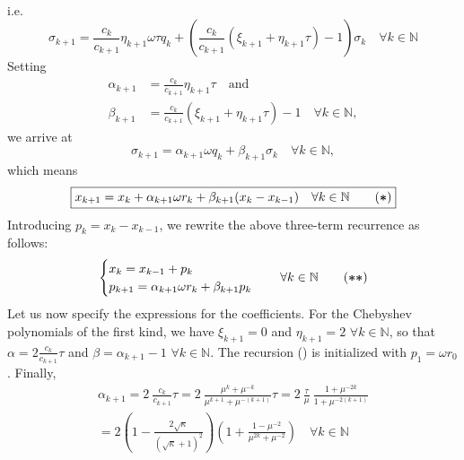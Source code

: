 \documentclass[12pt]{article}
\theoremstyle{definition}
\theoremstyle{remark}
\numberwithin{equation}{section}
\newcommand{\N}{\mathbb{N}}
\newcommand{\bigast}{\textbf{\textasteriskcentered}}
\begin{document}
\begin{enumerate}[label=(\roman*)]
\begin{align*}
      \end{align*}
      i.e.
      \begin{equation*}
        \sigma_{k+1} = \frac{c_k}{c_{k+1}} \eta_{k+1} \omega \tau q_k + \left(\frac{c_k}{c_{k+1}}(\xi_{k+1} + \eta_{k+1} \tau) - 1\right) \sigma_k \quad \forall k \in \N
      \end{equation*}
      Setting
      \begin{align*}
        \alpha_{k+1} &= \frac{c_k}{c_{k+1}} \eta_{k+1} \tau \quad \text{and}\\
        \beta_{k+1} &= \frac{c_k}{c_{k+1}}(\xi_{k+1} + \eta_{k+1} \tau) - 1 \quad \forall k \in \N,
      \end{align*}
      we arrive at
      \begin{equation*}
        \sigma_{k+1} = \alpha_{k+1} \omega q_k + \beta_{k+1} \sigma_k \quad \forall k \in \N,
      \end{equation*}
      which means
      \begin{equation*}
        \boxed{
          x_{k+1} = x_k + \alpha_{k+1} \omega r_k + \beta_{k+1} (x_k - x_{k-1}) \quad \forall k \in \N \tag{\bigast}
        }
      \end{equation*}
      Introducing $p_k = x_k - x_{k-1}$, we rewrite the above three-term recurrence as follows:
      \begin{equation*}
        \begin{cases}
          x_k = x_{k-1} + p_k\\
          p_{k+1} = \alpha_{k+1} \omega r_k + \beta_{k+1} p_k\\
        \end{cases} \quad \forall k \in \N \tag{\bigast\bigast}
      \end{equation*}
      Let us now specify the expressions for the coefficients. For the Chebyshev polynomials of the first kind, we have $\xi_{k+1} = 0$ and $\eta_{k+1} = 2$ $\forall k \in \N$, so that $\alpha = 2 \frac{c_k}{c_{k+1}} \tau$ and $\beta = \alpha_{k+1} - 1$ $\forall k \in \N$. The recursion (\bigast\bigast) is initialized with $p_1 = \omega r_0$. Finally,
      \begin{multline*}
        \alpha_{k+1} = 2\ \frac{c_k}{c_{k+1}} \tau = 2\ \frac{\mu^k + \mu^{-k}}{\mu^{k+1} + \mu^{-(k+1)}} \tau
        = 2\ \frac{\tau}{\mu}\ \frac{1+\mu^{-2k}}{1+\mu^{-2(k+1)}} \\= 2 \left(1 - \frac{2 \sqrt{\kappa}}{(\sqrt{\kappa}+1)^2}\right) \left(1 + \frac{1 - \mu^{-2}}{\mu^{2k}+\mu^{-2}}\right) \quad \forall k \in \N \\

\end{multline*}
\end{enumerate}
\end{document}
